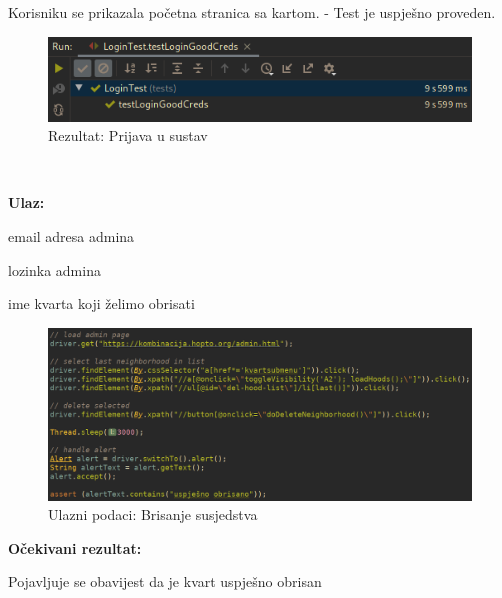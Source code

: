 				Korisniku se prikazala početna stranica sa kartom.	- Test je uspješno proveden.	
			
			
				\begin{figure}[H]
					\includegraphics[scale=0.57]{figures/login-pass.PNG}
					\centering
					\caption{Rezultat: Prijava u sustav}
					\label{fig:Prijava u sustav}
				\end{figure}
			
				\noindent {}
			
			\
			
			\noindent \textbf{Ulaz:}
			
			\begin{packed_enum}
				\item email adresa admina
				\item lozinka admina
				\item ime kvarta koji želimo obrisati 
				
				\end{packed_enum}
					
			\begin{figure}[H]
					\includegraphics[scale=0.57]{figures/admin-delete-neighborhood-code.PNG}
					\centering
					\caption{Ulazni podaci: Brisanje susjedstva}
					\label{fig:Brisanje susjedstva}
				\end{figure}	
				
		


			\noindent \textbf{Očekivani rezultat:}
				\begin{packed_enum}
				\item Pojavljuje se obavijest da je kvart uspješno obrisan
							
				
			\end{packed_enum}
			

